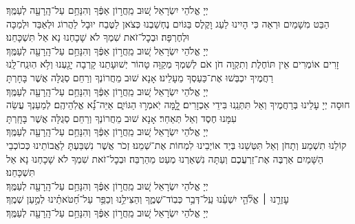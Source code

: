 \documentclass[twoside, openany, parskip=half, 11pt]{book}
\begin{document}
\nefilasapayim \label{nefilas_apayim}

\begin{sometimes}

\setlength{\LTpost}{0pt}

יְיָ אֱלֹהֵי יִשְׂרָאֵל  שׁ֚וּב מֵֽחֲר֣וֹן אַפֶּ֔ךָ וְהִנָּחֵ֥ם עַל־הָֽרָעָ֖ה לְעַמֶּֽךָ׃\\
הַבֵּט מִשָׁמַיִם וּרְאֵה כִּי הָיִינוּ לַעַג וָקֶלֶס בַּגּוֹיִם נֶחְשַׁבְנוּ כְּצֹאן לַטֶּבַח יוּבָל לַהֲרוֹג וּלְאַבֵּד וּלְמַכָּה וּלְחֶרְפָּה׃ וּבְכׇל־זֹאת שִׁמְךָ לֹא שָׁכָחְנוּ נָא אַל תִּשְׁכָּחֵנוּ׃\\
יְיָ אֱלֹהֵי יִשְׂרָאֵל שׁ֚וּב מֵֽחֲר֣וֹן אַפֶּ֔ךָ וְהִנָּחֵ֥ם עַל־הָֽרָעָ֖ה לְעַמֶּֽךָ׃\\
זָרִים אוֹמְרִים אֵין תּוֹחֶלֶת וְתִקְוָה חֹן אֹם לְשִׁמְךָ מְקַוָּה טָהוֹר יְשׁוּעָתֵנוּ קָרְבָה יָגַ֖עְנוּ וְלֹ֥א הֽוּנַֽח־לָֽנוּ רַחֲמֶיךָ יִכְבְּשׁוּ אֶת־כַּעַסְךָ מֵעָלֵינוּ׃ אָנָא שׁוּב מֵחֲרוֹנְךָ וְרַחֵם סְגֻלָּה אֲשֶׁר בָּחָרְתָּ\\
יְיָ אֱלֹהֵי יִשְׂרָאֵל שׁ֚וּב מֵֽחֲר֣וֹן אַפֶּ֔ךָ וְהִנָּחֵ֥ם עַל־הָֽרָעָ֖ה לְעַמֶּֽךָ׃\\
חוּסָה יְיָ עָלֵינוּ בְּרַחֲמֶיךָ וְאַל תִּתְּנֵֽנוּ בִּידֵי אַכְזָרִים׃
לׇׇ֭מָּה יֹֽאמְר֣וּ הַגּוֹיִ֑ם אַיֵּה־נָ֝֗א אֱלֹֽהֵיהֶֽם׃
לְמַעַנְךָ עֲשֵׂה עִמָּנוּ חֶסֶד וְאַל תְּאַחַר׃
אָנָא שׁוּב מֵחֲרוֹנְךָ וְרַחֵם סְגֻלָּה אֲשֶׁר בָּחָֽרְתָּ\\
יְיָ אֱלֹהֵי יִשְׂרָאֵל שׁ֚וּב מֵֽחֲר֣וֹן אַפֶּ֔ךָ וְהִנָּחֵ֥ם עַל־הָֽרָעָ֖ה לְעַמֶּֽךָ׃\\
קוֹלֵנוּ תִשְׁמַע וְתָחֹן וְאַל תִּטְּשֵׁנוּ בְּיַד אוֹיְבֵינוּ לִמְחוֹת אֶת־שְׁמֵנוּ׃
זְכֹר אֲשֶׁר נִשְׁבַּעְתָּ לַאֲבוֹתֵינוּ כְּכוֹכְבֵי הַשָּׁמַיִם אַרְבֶּה אֶת־זַרְעֲכֶם וְעַתָּה נִשְׁאַרְנוּ מְעַט מֵהַרְבֵּה׃
וּבְכׇל־זֹאת שִׁמְךָ לֹא שָׁכָחְנוּ נָא אַל תִּשְׁכָּחֵנוּ׃\\
יְיָ אֱלֹהֵי יִשְׂרָאֵל שׁ֚וּב מֵֽחֲר֣וֹן אַפֶּ֔ךָ וְהִנָּחֵ֥ם עַל־הָֽרָעָ֖ה לְעַמֶּֽךָ׃\\
עׇזְרֵ֤נוּ ׀ אֱלֹ֘הֵ֤י יִשְׁעֵ֗נוּ עַֽל־דְּבַ֥ר כְּבֽוֹד־שְׁמֶ֑ךָ וְהַצִּילֵ֥נוּ וְכַפֵּ֥ר עַל־חַ֝טֹּאתֵ֗ינוּ לְמַ֣עַן שְׁמֶֽךָ׃\\
יְיָ אֱלֹהֵי יִשְׂרָאֵל שׁ֚וּב מֵֽחֲר֣וֹן אַפֶּ֔ךָ וְהִנָּחֵ֥ם עַל־הָֽרָעָ֖ה לְעַמֶּֽךָ׃

\end{sometimes}
\end{document}
